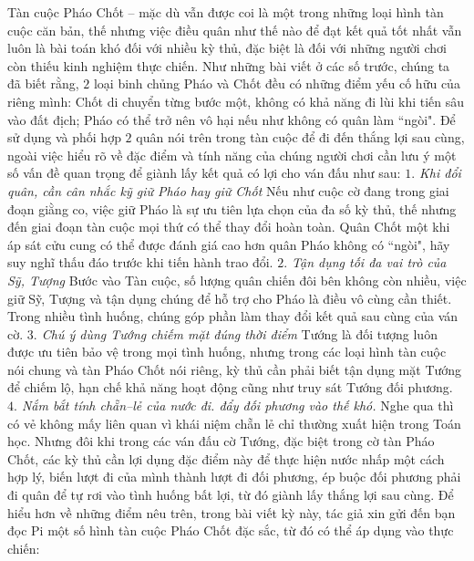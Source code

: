 \vspace*{175pt}
\begin{multicols}{2}
	Tàn cuộc Pháo Chốt -- mặc dù vẫn được coi là một trong những loại hình tàn cuộc căn bản, thế nhưng việc điều quân như thế nào để đạt kết quả tốt nhất vẫn luôn  là bài toán khó đối với nhiều kỳ thủ, đặc biệt là đối với những người chơi còn thiếu kinh nghiệm thực chiến. Như những bài viết ở các số trước, chúng ta đã biết rằng, $2$ loại binh chủng Pháo và Chốt đều có những điểm yếu cố hữu của riêng mình: Chốt di chuyển từng bước một, không có khả năng đi lùi khi tiến sâu vào đất địch; Pháo có thể trở nên vô hại nếu như không có quân làm ``ngòi". 
	\vskip 0.05cm
	Để sử dụng và phối hợp $2$ quân nói trên trong tàn cuộc để đi đến thắng lợi sau cùng, ngoài việc hiểu rõ về đặc điểm và tính năng của chúng người chơi cần lưu ý một số vấn đề quan trọng để giành lấy kết quả có lợi cho ván đấu như sau:
	\vskip 0.05cm
	\textit{$1.$	Khi đổi quân, cần cân nhắc kỹ giữ Pháo hay giữ Chốt}
	\vskip 0.05cm
	Nếu như cuộc cờ đang trong giai đoạn giằng co, việc giữ Pháo là sự ưu tiên lựa chọn của đa số kỳ thủ, thế nhưng đến giai đoạn tàn cuộc mọi thứ có thể thay đổi hoàn toàn. Quân Chốt một khi áp sát cửu cung có thể được đánh giá cao hơn quân Pháo không có ``ngòi", hãy suy nghĩ thấu đáo trước khi tiến hành trao đổi.
	\vskip 0.1cm
	\textit{$2.$	Tận dụng tối đa vai trò của Sỹ, Tượng}
	\vskip 0.1cm
	Bước vào Tàn cuộc, số lượng quân chiến đôi bên không còn nhiều, việc giữ Sỹ, Tượng và tận dụng chúng để hỗ trợ cho Pháo là điều vô cùng cần thiết. Trong nhiều tình huống, chúng góp phần làm thay đổi kết quả sau cùng của ván cờ.
	\vskip 0.1cm
	\textit{$3.$	Chú ý dùng Tướng chiếm mặt đúng thời điểm}
	\vskip 0.1cm
	Tướng là đối tượng luôn được ưu tiên bảo vệ trong mọi tình huống, nhưng trong các loại hình tàn cuộc nói chung và tàn Pháo Chốt nói riêng, kỳ thủ cần phải  biết tận dụng mặt Tướng để chiếm lộ, hạn chế khả năng hoạt động cũng như truy sát Tướng đối phương.
	\vskip 0.1cm
	\textit{$4.$	Nắm bắt tính chẵn--lẻ của nước đi. đẩy đối phương vào thế khó.}
	\vskip 0.1cm
	Nghe qua thì có vẻ không mấy liên quan vì khái niệm chẵn lẻ chỉ thường xuất hiện trong Toán học. Nhưng đôi khi trong các ván đấu cờ Tướng, đặc biệt trong cờ tàn Pháo Chốt, các kỳ thủ cần lợi dụng đặc điểm này để thực hiện nước nhấp một cách hợp lý, biến lượt đi của mình thành lượt đi đối phương, ép buộc đối phương phải đi quân để tự rơi vào tình huống bất lợi, từ đó giành lấy thắng lợi sau cùng.
	\vskip 0.1cm
	Để hiểu hơn về những điểm nêu trên, trong bài viết kỳ này, tác giả xin gửi đến bạn đọc Pi một số hình tàn cuộc Pháo Chốt đặc sắc, từ đó có thể áp dụng vào thực chiến:

\end{multicols}
